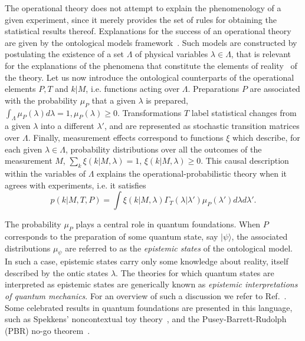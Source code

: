 \documentclass[a4paper,twocolumn,11pt,accepted=2024-01-17]{quantumarticle}
\begin{document}
The operational theory does not attempt to explain the phenomenology of a given experiment, since it merely provides the set of rules for obtaining the statistical results thereof. Explanations for the success of an operational theory are given by the ontological models framework~\cite{liang2011specker,leifer2014isthequantum}. Such models are constructed by postulating the existence of a set $\Lambda$ of physical variables $\lambda \in \Lambda$, that is relevant for the explanations of the phenomena that constitute the elements of reality~\cite{EinsteinPR35} of the theory. Let us now introduce the ontological counterparts of the operational elements $P, T$ and $k \vert M $, i.e. functions acting over $\Lambda$. Preparations $P$ are associated with the probability $\mu_P$ that a given $\lambda$ is prepared, $\int_\Lambda \mu_P(\lambda)d\lambda = 1, \mu_P(\lambda) \geq 0$. Transformations $T$ label statistical changes from a given $\lambda$ into a different $\lambda'$, and are represented as stochastic transition matrices over $\Lambda$. Finally, measurement effects correspond to functions $\xi$ which describe, for each given $\lambda \in \Lambda$, probability distributions over all the outcomes of the measurement $M$, {$\sum_{k }\xi(k\vert M,\lambda)=1$, $\xi(k\vert M,\lambda) \geq 0$.} This causal description within the variables of $\Lambda$ explains the operational-probabilistic theory when it agrees with experiments, i.e. it satisfies
\begin{equation}
    {p(k \vert M,T,P) = \int \xi(k \vert M,\lambda)\Gamma_T(\lambda \vert \lambda')\mu_P(\lambda') d\lambda d\lambda'.}
\end{equation}

{ The probability $\mu_P$ plays a central role in quantum foundations. When $P$ corresponds to the preparation of some quantum state, say $\vert \psi \rangle$, the associated distributions $\mu_{\psi}$ are referred to as the \textit{epistemic states} of the ontological model. In such a case, epistemic states carry only some knowledge about reality, itself described by the ontic states $\lambda$. The theories for which quantum states are interpreted as epistemic states are generically known as \textit{epistemic interpretations of quantum mechanics}. For an overview of such a discussion we refer to Ref.~\cite{leifer2014isthequantum}. Some celebrated results in quantum foundations are presented in this language, such as Spekkens' noncontextual toy theory~\cite{spekkens2007evidence}, and the Pusey-Barrett-Rudolph (PBR) no-go theorem~\cite{pusey2012onthereality}. }
\end{document}
